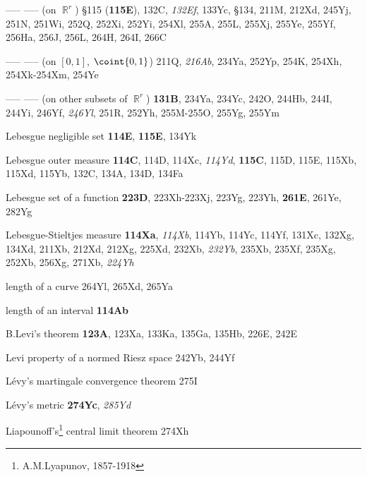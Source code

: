 ----- ----- (on $\BbbR^r$) \S115 ({\bf 115E}), 132C, {\it 132Ef}, 133Yc,
\S134,
  211M,  212Xd, 245Yj, 251N, 251Wi, 252Q, 252Xi, 252Yi, 254Xl,
  255A, 255L, 255Xj, 255Ye, 255Yf, 256Ha, 256J, 256L,
264H, 264I, 266C


----- ----- (on $[0,1]$, $\coint{0,1}$) 211Q, {\it 216Ab},
234Ya, 252Yp, 254K, 254Xh, 254Xk-254Xm, 
254Ye


----- ----- (on other subsets of $\BbbR^r$) {\bf 131B},
  234Ya, 234Yc, 242O, 244Hb, 244I, 244Yi,
246Yf, {\it 246Yl},
251R, 252Yh, 255M-255O, 
255Yg, 255Ym





Lebesgue negligible set {\bf 114E}, {\bf 115E}, 134Yk



Lebesgue outer measure {\bf 114C}, 114D, 114Xc, {\it 114Yd}, {\bf
115C}, 115D, 115E, 115Xb, 115Xd, 115Yb, 132C, 134A, 134D, 134Fa

Lebesgue set of a function {\bf 223D},
223Xh-223Xj, 
223Yg, 223Yh, {\bf 261E}, 261Ye, 282Yg


Lebesgue-Stieltjes measure {\bf 114Xa}, {\it 114Xb},
114Yb, 114Yc, 114Yf, 131Xc, 132Xg, 134Xd,
  211Xb, 212Xd, 212Xg, 225Xd, 232Xb, {\it 232Yb}, 235Xb, 235Xf, 235Xg,
252Xb, 256Xg, 271Xb, {\it 224Yh}











length of a curve 264Yl, 265Xd, 265Ya




length of an interval {\bf 114Ab}




B.Levi's theorem {\bf 123A}, 123Xa, 133Ka, 135Ga, 135Hb,
  226E, 242E

Levi property of a normed Riesz space 242Yb, 244Yf








L\'evy's martingale convergence theorem 275I


L\'evy's metric {\bf 274Yc}, {\it 285Yd}






Liapounoff's\footnote{A.M.Lyapunov, 1857-1918}
central limit theorem 274Xh






